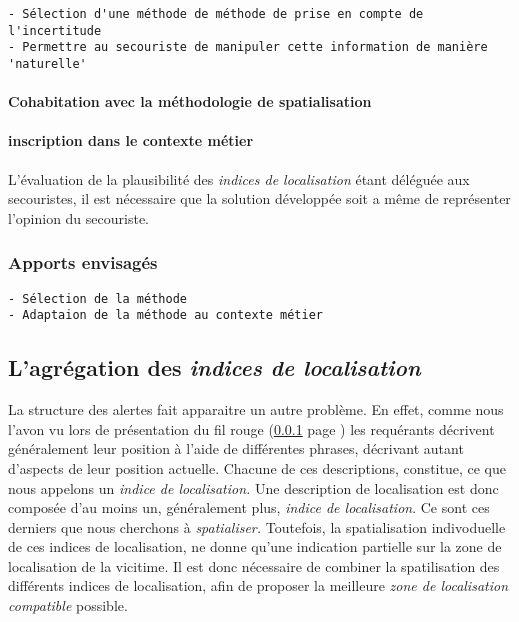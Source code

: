 \begin{verbatim}
- Sélection d'une méthode de méthode de prise en compte de
l'incertitude
- Permettre au secouriste de manipuler cette information de manière
'naturelle' 
\end{verbatim}


\paragraph{Cohabitation avec la méthodologie de spatialisation}

\paragraph{inscription dans le contexte métier}

L'évaluation de la plausibilité des \emph{indices de localisation}
étant déléguée aux secouristes, il est nécessaire que la solution
développée soit a même de représenter l'opinion du secouriste.


\subsubsection{Apports envisagés}

\begin{verbatim}
- Sélection de la méthode
- Adaptaion de la méthode au contexte métier
\end{verbatim}


\subsection{L'agrégation des \emph{indices de localisation}}
\label{subsec:2-1-4}

La structure des alertes fait apparaitre un autre problème. En effet,
comme nous l'avon vu lors de présentation du fil rouge (\ref{} page
\pageref{})  les
requérants décrivent généralement leur position à l'aide de
différentes phrases, décrivant autant d'aspects de leur position
actuelle. Chacune de ces descriptions, constitue, ce que nous appelons
un \emph{indice de localisation.} Une description de localisation est
donc composée d'au moins un, généralement plus, \emph{indice de
  localisation}. Ce sont ces derniers que nous cherchons à
\emph{spatialiser.} Toutefois, la spatialisation indivoduelle de ces
indices de localisation, ne donne qu'une indication partielle sur la
zone de localisation de la vicitime. Il est donc nécessaire de
combiner la spatilisation des différents indices de localisation, afin
de proposer la meilleure \emph{zone de localisation compatible}
possible.

